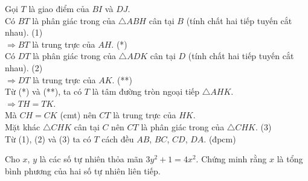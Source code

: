 \begin{ex}
{		Gọi $T$ là giao điểm của $BI$ và $DJ$.\\
		Có $BT$ là phân giác trong của $\triangle ABH$ cân tại $B$ (tính chất hai tiếp tuyến cắt nhau). \quad (1)\\
		$\Rightarrow BT$ là trung trực của $AH$. \quad (*)\\
		Có $DT$ là phân giác trong của $\triangle ADK$ cân tại $D$ (tính chất hai tiếp tuyến cắt nhau). \quad (2)\\
		$\Rightarrow DT$ là trung trực của $AK$. \quad (**)\\
		Từ (*) và (**), ta có $T$ là tâm đường tròn ngoại tiếp $\triangle AHK$.\\
		$\Rightarrow TH=TK$.\\
		Mà $CH=CK$ (cmt) nên $CT$ là trung trực của $HK$.\\
		Mặt khác $\triangle CHK$ cân tại $C$ nên $CT$ là phân giác trong của $\triangle CHK$. \quad (3)\\
		Từ (1), (2) và (3) ta có $T$ cách đều $AB$, $BC$, $CD$, $DA$. (đpcm)
	}
\end{ex}

\begin{ex}%
	Cho $x$, $y$ là các số tự nhiên thỏa mãn $3y^2+1=4x^2$. Chứng minh rằng $x$ là tổng bình phương của hai số tự nhiên liên tiếp.
\end{ex}

